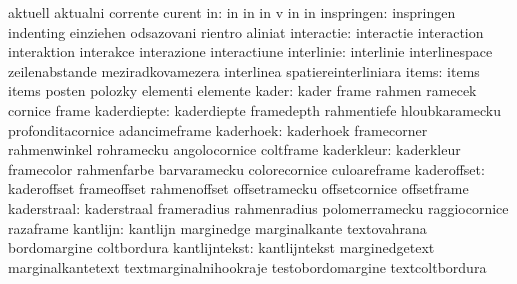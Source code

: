                            aktuell                   aktualni
                           corrente                  curent
                       in: in                        in
                           in                        v
                           in                        in
               inspringen: inspringen                indenting
                           einziehen                 odsazovani
                           rientro                   aliniat
               interactie: interactie                interaction
                           interaktion               interakce
                           interazione               interactiune
               interlinie: interlinie                interlinespace
                           zeilenabstande            meziradkovamezera
                           interlinea                spatiereinterliniara
                    items: items                     items
                           posten                    polozky
                           elementi                  elemente
                    kader: kader                     frame
                           rahmen                    ramecek
                           cornice                   frame
              kaderdiepte: kaderdiepte               framedepth
                           rahmentiefe               hloubkaramecku
                           profonditacornice         adancimeframe
                kaderhoek: kaderhoek                 framecorner
                           rahmenwinkel              rohramecku
                           angolocornice             coltframe
               kaderkleur: kaderkleur                framecolor
                           rahmenfarbe               barvaramecku
                           colorecornice             culoareframe
              kaderoffset: kaderoffset               frameoffset
                           rahmenoffset              offsetramecku
                           offsetcornice             offsetframe
              kaderstraal: kaderstraal               frameradius
                           rahmenradius              polomerramecku
                           raggiocornice             razaframe
                 kantlijn: kantlijn                  marginedge
                           marginalkante             textovahrana
                           bordomargine              coltbordura
            kantlijntekst: kantlijntekst             marginedgetext
                           marginalkantetext         textmarginalnihookraje
                           testobordomargine         textcoltbordura
